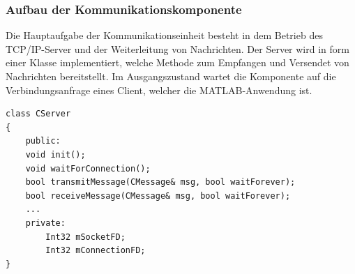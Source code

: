 \documentclass{article}
\begin{document}
\subsubsection{Aufbau der Kommunikationskomponente}
Die Hauptaufgabe der Kommunikationseinheit besteht in dem Betrieb des TCP/IP-Server und der Weiterleitung von Nachrichten. Der Server wird in form einer Klasse implementiert, welche Methode zum Empfangen und Versendet von Nachrichten bereitstellt. Im Ausgangszustand wartet die Komponente auf die Verbindungsanfrage eines Client, welcher die MATLAB-Anwendung ist. 

\begin{lstlisting}
class CServer
{
	public:
	void init();
	void waitForConnection();
	bool transmitMessage(CMessage& msg, bool waitForever);
	bool receiveMessage(CMessage& msg, bool waitForever);
	...
	private:
		Int32 mSocketFD;
		Int32 mConnectionFD;
}
\end{lstlisting}
\end{document}
